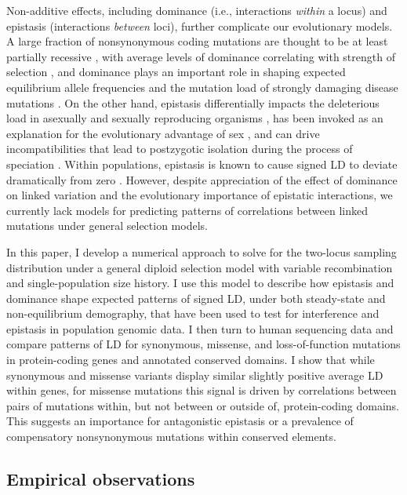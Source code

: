 \documentclass[]{article}
\begin{document}
Non-additive effects, including dominance (i.e., interactions \emph{within} a
locus) and epistasis (interactions \emph{between} loci), further complicate our
evolutionary models. A large fraction of nonsynonymous coding mutations are
thought to be at least partially recessive \citep{Agrawal2011-wb,
Huber2018-cp}, with average levels of dominance correlating with strength of
selection \citep{Kacser1981-nc}, and dominance plays an important role in
shaping expected equilibrium allele frequencies and the mutation load of
strongly damaging disease mutations \citep{Clark1998-kq}. On the other hand,
epistasis differentially impacts the deleterious load in asexually and sexually
reproducing organisms \citep{Kimura1966-gc,Kondrashov1995-va}, has been invoked
as an explanation for the evolutionary advantage of sex
\citep{Kondrashov1982-sf,Charlesworth1990-kw,Barton1998-lu}, and can drive
incompatibilities that lead to postzygotic isolation during the process of
speciation \citep{Turelli2000-kz}. Within populations, epistasis is known to
cause signed LD to deviate dramatically from zero \citep{Charlesworth1990-kw,
Kondrashov1995-va}. However, despite appreciation of the effect of dominance on
linked variation \citep{Turelli2000-kz, Zhao2016-bb} and the evolutionary
importance of epistatic interactions, we currently lack models for predicting
patterns of correlations between linked mutations under general selection
models.

In this paper, I develop a numerical approach to solve for the two-locus
sampling distribution under a general diploid selection model with variable
recombination and single-population size history. I use this model to describe
how epistasis and dominance shape expected patterns of signed LD, under both
steady-state and non-equilibrium demography, that have been used to test for
interference and epistasis in population genomic data. I then turn to human
sequencing data and compare patterns of LD for synonymous, missense, and
loss-of-function mutations in protein-coding genes and annotated conserved
domains. I show that while synonymous and missense variants display similar
slightly positive average LD within genes, for missense mutations this signal
is driven by correlations between pairs of mutations within, but not between or
outside of, protein-coding domains. This suggests an importance for
antagonistic epistasis or a prevalence of compensatory nonsynonymous mutations
within conserved elements.

\subsection{Empirical observations}\label{sec:empirical-observations}
\end{document}
